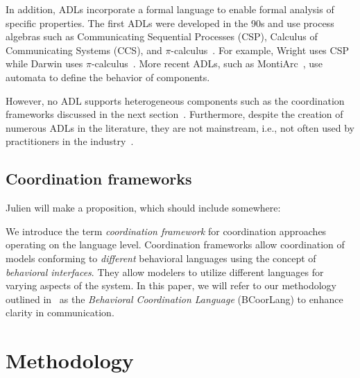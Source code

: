 \documentclass[runningheads]{llncs}
\begin{document}
In addition, ADLs incorporate a formal language to enable formal analysis of specific properties.
The first ADLs were developed in the 90s and use process algebras such as Communicating Sequential Processes (CSP), Calculus of Communicating Systems (CCS), and $\pi$-calculus~\cite{ozkayaAreWeThere2013}.
For example, Wright uses CSP~\cite{allenFormalBasisArchitectural1997} while Darwin uses $\pi$-calculus~\cite{mageeSpecifyingDistributedSoftware1995}.
More recent ADLs, such as MontiArc~\cite{haberMontiArcArchitecturalModeling2014}, use automata to define the behavior of components.

However, no ADL supports heterogeneous components such as the coordination frameworks discussed in the next section~\cite{medvidovicClassificationComparisonFramework2000}.
Furthermore, despite the creation of numerous ADLs in the literature, they are not mainstream, i.e., not often used by practitioners in the industry~\cite{clementsSurveyArchitectureDescription1996,woodsArchitectureDescriptionLanguages2005,pandeyArchitecturalDescriptionLanguages2010,ozkayaAreWeThere2013,medvidovicMovingArchitecturalDescription2006}.

\subsection{Coordination frameworks} \label{subsec: frameworks}

Julien will make a proposition, which should include somewhere:

We introduce the term \textit{coordination framework} for coordination approaches operating on the language level.
Coordination frameworks allow coordination of models conforming to \textit{different} behavioral languages using the concept of \textit{behavioral interfaces}.
They allow modelers to utilize different languages for varying aspects of the system.
In this paper, we will refer to our methodology outlined in~\cite{krauterBehavioralConsistencyMultimodeling2023} as the \textit{Behavioral Coordination Language} (BCoorLang) to enhance clarity in communication.

\section{Methodology} \label{sec: methodology}
\end{document}
